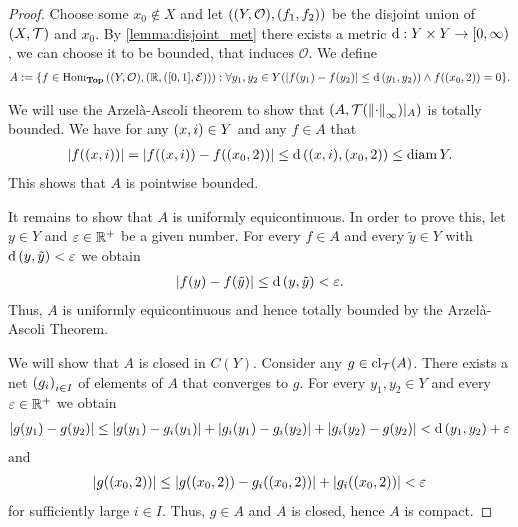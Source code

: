 \begin{proof}
	Choose some $x_0 \notin X$ and let $\pbraces{\tspace[Y][O], (f_1, f_2)}$ be the disjoint union of $\tspace$ and $x_0$. By \ref{lemma:disjoint_met} there exists a metric $\metric: Y \times Y \to [0, \infty)$, we can choose it to be bounded, that induces $\mathcal{O}$. We define
	\begin{align*}
		A := \Bbraces{f \in \Hom_\Top\pbraces{\tspace[Y][O], \pbraces{\R, \eucl}} : \forall y_1, y_2 \in Y\pbraces{\vbraces{f(y_1) - f(y_2)} \leq \metric\pbraces{y_1, y_2}} \land f\pbraces{\pbraces{x_0, 2}} = 0}.
	\end{align*}
	
	We will use the Arzelà-Ascoli theorem \cite[p. 458]{Ana1&2} to show that $\pbraces{A, \mathcal{T}\pbraces{\norm[\infty]{\cdot}}\vert_A}$ is totally bounded. We have for any $\pbraces{x,i} \in Y$ and any $f \in A$ that
	\begin{align*}
		\vbraces{f\pbraces{(x,i)}} = \vbraces{f\pbraces{(x,i)} - f\pbraces{\pbraces{x_0, 2}}} \leq \metric\pbraces{(x,i), \pbraces{x_0, 2}} \leq \diam Y.
	\end{align*}
	This shows that $A$ is pointwise bounded.
	
	It remains to show that $A$ is uniformly equicontinuous. In order to prove this, let $y \in Y$ and $\varepsilon \in \R^+$ be a given number. For every $f \in A$ and every $\tilde{y} \in Y$ with $\metric\pbraces{y, \tilde{y}} < \varepsilon$ we obtain
	\begin{align*}
		\vbraces{f(y) - f\pbraces{\tilde{y}}} \leq \metric\pbraces{y, \tilde{y}} < \varepsilon.
	\end{align*}
	Thus, $A$ is uniformly equicontinuous and hence totally bounded by the Arzelà-Ascoli Theorem.
	
	We will show that $A$ is closed in $C(Y)$. Consider any $g \in \cl{A}$. There exists a net $\pbraces{g_i}_{i \in I}$ of elements of $A$ that converges to $g$. For every $y_1, y_2 \in Y$ and every $\varepsilon \in \R^+$ we obtain
	\begin{align*}
		\vbraces{g\pbraces{y_1} - g\pbraces{y_2}} \leq \vbraces{g\pbraces{y_1} - g_i\pbraces{y_1}} + \vbraces{g_i\pbraces{y_1} - g_i\pbraces{y_2}} + \vbraces{g_i\pbraces{y_2} - g\pbraces{y_2}} < \metric\pbraces{y_1, y_2} + \varepsilon
	\end{align*} 
	and 
	\begin{align*}
		\vbraces{g\pbraces{\pbraces{x_0, 2}}} \leq \vbraces{g\pbraces{\pbraces{x_0, 2}} - g_i\pbraces{\pbraces{x_0, 2}}} + \vbraces{g_i\pbraces{\pbraces{x_0, 2}}} < \varepsilon
	\end{align*}
	for sufficiently large $i \in I$. Thus, $g \in A$ and $A$ is closed, hence $A$ is compact. 
	

\end{proof}
